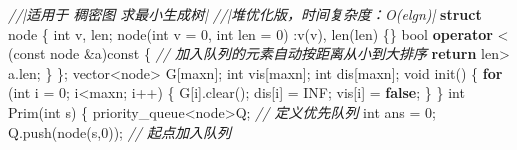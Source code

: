 \documentclass[
]{article}
\newenvironment{Shaded}{}{}
\newcommand{\AttributeTok}[1]{\textcolor[rgb]{0.49,0.56,0.16}{#1}}
\newcommand{\CommentTok}[1]{\textcolor[rgb]{0.38,0.63,0.69}{\textit{#1}}}
\newcommand{\ControlFlowTok}[1]{\textcolor[rgb]{0.00,0.44,0.13}{\textbf{#1}}}
\newcommand{\DataTypeTok}[1]{\textcolor[rgb]{0.56,0.13,0.00}{#1}}
\newcommand{\DecValTok}[1]{\textcolor[rgb]{0.25,0.63,0.44}{#1}}
\newcommand{\KeywordTok}[1]{\textcolor[rgb]{0.00,0.44,0.13}{\textbf{#1}}}
\newcommand{\NormalTok}[1]{#1}
\newcommand{\OperatorTok}[1]{\textcolor[rgb]{0.40,0.40,0.40}{#1}}
\begin{document}
\begin{Shaded}
\begin{Highlighting}[]
    \CommentTok{//|适用于 稠密图 求最小生成树|}
    \CommentTok{//|堆优化版，时间复杂度：O(elgn)|}
\KeywordTok{struct}\NormalTok{ node }\OperatorTok{\{}  
    \DataTypeTok{int}\NormalTok{ v}\OperatorTok{,}\NormalTok{ len}\OperatorTok{;}  
\NormalTok{    node}\OperatorTok{(}\DataTypeTok{int}\NormalTok{ v }\OperatorTok{=} \DecValTok{0}\OperatorTok{,} \DataTypeTok{int}\NormalTok{ len }\OperatorTok{=} \DecValTok{0}\OperatorTok{)} \OperatorTok{:}\NormalTok{v}\OperatorTok{(}\NormalTok{v}\OperatorTok{),}\NormalTok{ len}\OperatorTok{(}\NormalTok{len}\OperatorTok{)} \OperatorTok{\{\}}  
    \DataTypeTok{bool} \KeywordTok{operator} \OperatorTok{\textless{}} \OperatorTok{(}\AttributeTok{const}\NormalTok{ node }\OperatorTok{\&}\NormalTok{a}\OperatorTok{)}\AttributeTok{const} \OperatorTok{\{}  \CommentTok{// 加入队列的元素自动按距离从小到大排序  }
        \ControlFlowTok{return}\NormalTok{ len}\OperatorTok{\textgreater{}}\NormalTok{ a}\OperatorTok{.}\NormalTok{len}\OperatorTok{;}  
    \OperatorTok{\}}  
\OperatorTok{\};}
\NormalTok{vector}\OperatorTok{\textless{}}\NormalTok{node}\OperatorTok{\textgreater{}}\NormalTok{ G}\OperatorTok{[}\NormalTok{maxn}\OperatorTok{];}
\DataTypeTok{int}\NormalTok{ vis}\OperatorTok{[}\NormalTok{maxn}\OperatorTok{];}
\DataTypeTok{int}\NormalTok{ dis}\OperatorTok{[}\NormalTok{maxn}\OperatorTok{];}
\DataTypeTok{void}\NormalTok{ init}\OperatorTok{()} \OperatorTok{\{}  
    \ControlFlowTok{for} \OperatorTok{(}\DataTypeTok{int}\NormalTok{ i }\OperatorTok{=} \DecValTok{0}\OperatorTok{;}\NormalTok{ i}\OperatorTok{\textless{}}\NormalTok{maxn}\OperatorTok{;}\NormalTok{ i}\OperatorTok{++)} \OperatorTok{\{}  
\NormalTok{        G}\OperatorTok{[}\NormalTok{i}\OperatorTok{].}\NormalTok{clear}\OperatorTok{();}  
\NormalTok{        dis}\OperatorTok{[}\NormalTok{i}\OperatorTok{]} \OperatorTok{=}\NormalTok{ INF}\OperatorTok{;}  
\NormalTok{        vis}\OperatorTok{[}\NormalTok{i}\OperatorTok{]} \OperatorTok{=} \KeywordTok{false}\OperatorTok{;}  
    \OperatorTok{\}}  
\OperatorTok{\}}  
\DataTypeTok{int}\NormalTok{ Prim}\OperatorTok{(}\DataTypeTok{int}\NormalTok{ s}\OperatorTok{)} \OperatorTok{\{}  
\NormalTok{    priority\_queue}\OperatorTok{\textless{}}\NormalTok{node}\OperatorTok{\textgreater{}}\NormalTok{Q}\OperatorTok{;} \CommentTok{// 定义优先队列  }
    \DataTypeTok{int}\NormalTok{ ans }\OperatorTok{=} \DecValTok{0}\OperatorTok{;}  
\NormalTok{    Q}\OperatorTok{.}\NormalTok{push}\OperatorTok{(}\NormalTok{node}\OperatorTok{(}\NormalTok{s}\OperatorTok{,}\DecValTok{0}\OperatorTok{));}  \CommentTok{// 起点加入队列  }

\end{Highlighting}
\end{Shaded}
\end{document}
